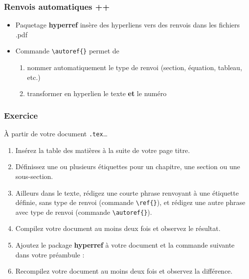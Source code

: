 \begin{frame}[c,fragile]

	\frametitle{Renvois automatiques ++}
	
	\begin{itemize}
		\item Paquetage \textbf{hyperref} insère des hyperliens vers des renvois dans les fichiers
		.pdf
		\item Commande \lstinline|\autoref{}| permet de
		
			\begin{enumerate}
				\item nommer automatiquement le type de renvoi (section, équation, tableau, etc.)
				\item transformer en hyperlien le texte \textbf{et} le numéro
			\end{enumerate}
	\end{itemize}
\end{frame}


\begin{frame}[fragile]

	\frametitle{Exercice \thenoExercice}
	
	À partir de votre document \texttt{.tex}\dots	
	\begin{enumerate}
		\item Insérez la table des matières à la suite de votre page titre.
		\item Définissez une ou plusieurs étiquettes pour un chapitre, une section ou une %
			sous-section.
		\item Ailleurs dans le texte, rédigez une courte phrase renvoyant à une étiquette 
			définie, sans type de renvoi (commande \lstinline|\ref{}|), et rédigez une autre 
			phrase avec type de renvoi (commande \lstinline|\autoref{}|).
		\item Compilez votre document au moins deux fois et observez le résultat.
		\item Ajoutez le package \textbf{hyperref} à votre document et la commande suivante dans 
			votre préambule :
	\begin{codesource}
	\hypersetup{colorlinks=true,allcolors=blue}
	\end{codesource}
		\item Recompilez votre document au moins deux fois et observez la différence.
	\end{enumerate}
\end{frame}
